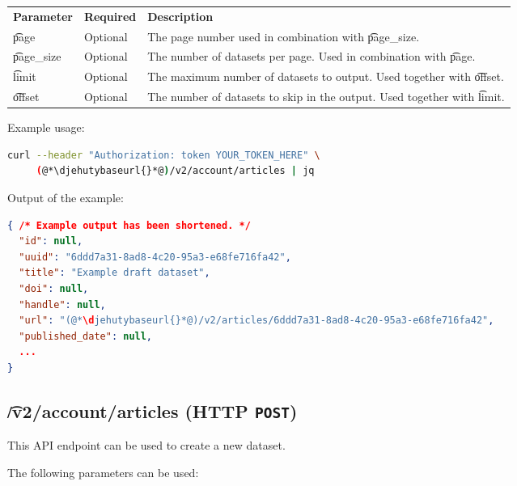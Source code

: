 \begin{tabularx}{\textwidth}{*{2}{!{\VRule[-1pt]}l}!{\VRule[-1pt]}X}
  \headrow
  \textbf{Parameter}   & \textbf{Required} & \textbf{Description}\\
  \t{page}             & Optional & The page number used in combination with
                                    \t{page\_size}.\\
  \t{page\_size}       & Optional & The number of datasets per page.  Used
                                    in combination with \t{page}.\\
  \t{limit}            & Optional & The maximum number of datasets to output.
                                    Used together with \t{offset}.\\
  \t{offset}           & Optional & The number of datasets to skip in the
                                    output.  Used together with \t{limit}.
\end{tabularx}

  Example usage:
\begin{lstlisting}[language=bash]
curl --header "Authorization: token YOUR_TOKEN_HERE" \
     (@*\djehutybaseurl{}*@)/v2/account/articles | jq
\end{lstlisting}

  Output of the example:
\begin{lstlisting}[language=JSON]
{ /* Example output has been shortened. */
  "id": null,
  "uuid": "6ddd7a31-8ad8-4c20-95a3-e68fe716fa42",
  "title": "Example draft dataset",
  "doi": null,
  "handle": null,
  "url": "(@*\djehutybaseurl{}*@)/v2/articles/6ddd7a31-8ad8-4c20-95a3-e68fe716fa42",
  "published_date": null,
  ...
}
\end{lstlisting}

\subsection{\t{/v2/account/articles} (HTTP \texttt{POST})}

  This API endpoint can be used to create a new dataset.

  The following parameters can be used:

